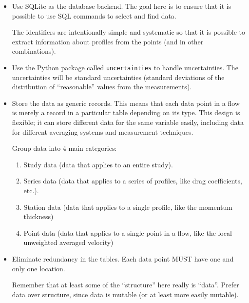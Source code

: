 \begin{itemize}

\item

Use SQLite as the database backend.  The goal here is to ensure that it
is possible to use SQL commands to select and find data.

The identifiers are intentionally simple and systematic so that it is possible
to extract information about profiles from the points (and in other
combinations).

\item

Use the Python package called \texttt{uncertainties} to handle uncertainties.
The uncertainties will be standard uncertainties (standard deviations of the
distribution of ``reasonable'' values from the measurements).

\item

Store the data as generic records.  This means that each data point in a flow
is merely a record in a particular table depending on its type.  This design is
flexible; it can store different data for the same variable easily, including
data for different averaging systems and measurement techniques.

Group data into 4 main categories:

    \begin{enumerate}

    \item Study data (data that applies to an entire study).

    \item Series data (data that applies to a series of profiles, like drag
    coefficients, etc.).

    \item Station data (data that applies to a single profile, like the
    momentum thickness)

    \item Point data (data that applies to a single point in a flow, like the
    local unweighted averaged velocity)

    \end{enumerate}

\item Eliminate redundancy in the tables.  Each data point MUST have one and
only one location.

Remember that at least some of the ``structure'' here really is ``data''.
Prefer data over structure, since data is mutable (or at least more easily
mutable).


\end{itemize}
